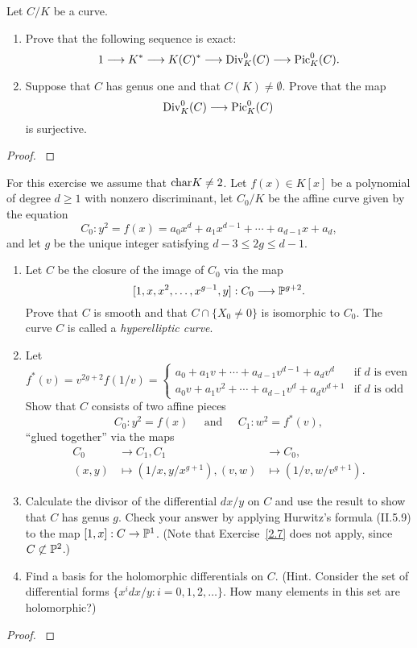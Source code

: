 \documentclass[12pt,reqno]{amsart}
\begin{document}
\begin{exe}\label{2.13}
Let $C/K$ be a curve.
\begin{enumerate}
\item
Prove that the following sequence is exact:
\[
1 \longrightarrow K^\ast \longrightarrow K(C)^\ast \longrightarrow {\operatorname{Div}}^0_K(C) \longrightarrow {\operatorname{Pic}}_K^0(C).
\]
\item
Suppose that $C$ has genus one and that $C(K)\neq \emptyset$.  Prove that the map
\[
{\operatorname{Div}}_K^0(C)\longrightarrow {\operatorname{Pic}}_K^0(C)
\] 
is surjective.
\end{enumerate}
\begin{proof}\label{s2.13}

\end{proof} 
\end{exe} 

\begin{exe}\label{2.14}
For this exercise we assume that ${\operatorname{char}} K \neq 2$.  Let $f(x)\in K[x]$ be a polynomial of degree $d \geq 1$ with nonzero discriminant, let $C_0/K$ be the affine curve given by the equation
\[
C_0: y^2=f(x)=a_0x^d+a_1x^{d-1}+\cdots + a_{d-1}x+a_d,
\]
and let $g$ be the unique integer satisfying $d-3\leq 2g \leq d-1$.
\begin{enumerate}
\item
Let $C$ be the closure of the image of $C_0$ via the map
\[
[1, x, x^2, \hdots, x^{g-1}, y]: C_0 \longrightarrow {\mathbb P}^{g+2}.
\]
Prove that $C$ is smooth and that $C \cap \{X_0\neq 0\}$ is isomorphic to $C_0$.  The curve $C$ is called a \emph{hyperelliptic curve}.
\item
Let
\[
f^\ast (v)=v^{2g+2} f(1/v)=\begin{cases} a_0+a_1v+\cdots + a_{d-1}v^{d-1}+a_dv^d  &\mbox{if $d$ is even}\\
                                         a_0v+a_1v^2+\cdots + a_{d-1}v^{d}+a_dv^{d+1}  &\mbox{if $d$ is odd}
                                         \end{cases}
\]
Show that $C$ consists of two affine pieces
\[
C_0: y^2=f(x)\;\;\;\;\;\mbox{and}\;\;\;\;\;C_1: w^2=f^\ast(v),
\]
``glued together'' via the maps
\begin{align*}
C_0 & \to C_1,  C_1&\to C_0,\\
(x, y)&\mapsto (1/x, y/x^{g+1}), (v, w)&\mapsto(1/v, w/v^{g+1}).
\end{align*}

\item
Calculate the divisor of the differential $dx/y$ on $C$ and use the result to show that $C$ has genus $g$.  Check your answer by applying Hurwitz's formula (II.5.9) to the map $[1, x]: C \to {\mathbb P}^1$.  (Note that Exercise~\ref{2.7} does not apply, since $C \not\subset {\mathbb P}^2$.)

\item
Find a basis for the holomorphic differentials on $C$.  (Hint.  Consider the set of differential forms $\{x^idx/y : i=0, 1, 2, \hdots \}$.  How many elements in this set are holomorphic?)
\end{enumerate}
\begin{proof}\label{s2.14}

\end{proof} 
\end{exe} 
\end{document}
